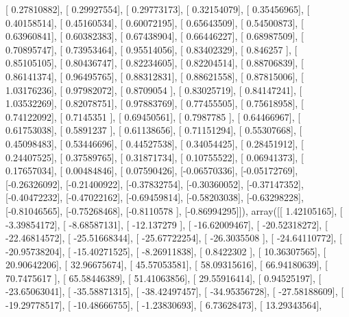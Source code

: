 \documentclass{article}
\begin{document}
       [ 0.27810882],
       [ 0.29927554],
       [ 0.29773173],
       [ 0.32154079],
       [ 0.35456965],
       [ 0.40158514],
       [ 0.45160534],
       [ 0.60072195],
       [ 0.65643509],
       [ 0.54500873],
       [ 0.63960841],
       [ 0.60382383],
       [ 0.67438904],
       [ 0.66446227],
       [ 0.68987509],
       [ 0.70895747],
       [ 0.73953464],
       [ 0.95514056],
       [ 0.83402329],
       [ 0.846257  ],
       [ 0.85105105],
       [ 0.80436747],
       [ 0.82234605],
       [ 0.82204514],
       [ 0.88706839],
       [ 0.86141374],
       [ 0.96495765],
       [ 0.88312831],
       [ 0.88621558],
       [ 0.87815006],
       [ 1.03176236],
       [ 0.97982072],
       [ 0.8709054 ],
       [ 0.83025719],
       [ 0.84147241],
       [ 1.03532269],
       [ 0.82078751],
       [ 0.97883769],
       [ 0.77455505],
       [ 0.75618958],
       [ 0.74122092],
       [ 0.7145351 ],
       [ 0.69450561],
       [ 0.7987785 ],
       [ 0.64466967],
       [ 0.61753038],
       [ 0.5891237 ],
       [ 0.61138656],
       [ 0.71151294],
       [ 0.55307668],
       [ 0.45098483],
       [ 0.53446696],
       [ 0.44527538],
       [ 0.34054425],
       [ 0.28451912],
       [ 0.24407525],
       [ 0.37589765],
       [ 0.31871734],
       [ 0.10755522],
       [ 0.06941373],
       [ 0.17657034],
       [ 0.00484846],
       [ 0.07590426],
       [-0.06570336],
       [-0.05172769],
       [-0.26326092],
       [-0.21400922],
       [-0.37832754],
       [-0.30360052],
       [-0.37147352],
       [-0.40472232],
       [-0.47022162],
       [-0.69459814],
       [-0.58203038],
       [-0.63298228],
       [-0.81046565],
       [-0.75268468],
       [-0.8110578 ],
       [-0.86994295]]), array([[   1.42105165],
       [  -3.39854172],
       [  -8.68587131],
       [ -12.137279  ],
       [ -16.62009467],
       [ -20.52318272],
       [ -22.46814572],
       [ -25.51668344],
       [ -25.67722254],
       [ -26.3035508 ],
       [ -24.64110772],
       [ -20.95738204],
       [ -15.40271525],
       [  -8.26911838],
       [   0.8422302 ],
       [  10.36307565],
       [  20.90642206],
       [  32.96675674],
       [  45.57053581],
       [  58.09315616],
       [  66.94180639],
       [  70.7475617 ],
       [  65.58446389],
       [  51.41063856],
       [  29.55916414],
       [   0.94525197],
       [ -23.65063041],
       [ -35.58871315],
       [ -38.42497457],
       [ -34.95356728],
       [ -27.58188609],
       [ -19.29778517],
       [ -10.48666755],
       [  -1.23830693],
       [   6.73628473],
       [  13.29343564],
\end{document}
